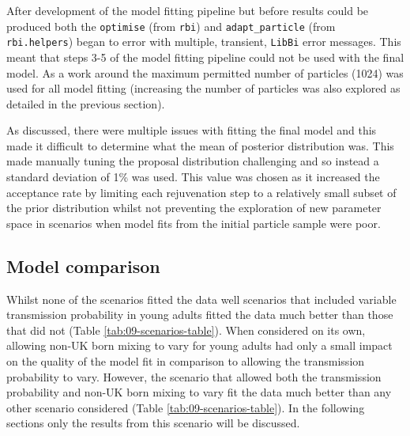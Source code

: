 \documentclass[11pt,twoside]{bristolthesis}
\begin{document}
  After development of the model fitting pipeline but before results could be produced both the \texttt{optimise} (from \texttt{rbi}) and \texttt{adapt\_particle} (from \texttt{rbi.helpers}) began to error with multiple, transient, \texttt{LibBi} error messages. This meant that steps 3-5 of the model fitting pipeline could not be used with the final model. As a work around the maximum permitted number of particles (1024) was used for all model fitting (increasing the number of particles was also explored as detailed in the previous section).
  
  As discussed, there were multiple issues with fitting the final model and this made it difficult to determine what the mean of posterior distribution was. This made manually tuning the proposal distribution challenging and so instead a standard deviation of 1\% was used. This value was chosen as it increased the acceptance rate by limiting each rejuvenation step to a relatively small subset of the prior distribution whilst not preventing the exploration of new parameter space in scenarios when model fits from the initial particle sample were poor.
  
  \hypertarget{model-comparison-1}{%
  \subsection{Model comparison}\label{model-comparison-1}}
  
  Whilst none of the scenarios fitted the data well scenarios that included variable transmission probability in young adults fitted the data much better than those that did not (Table \ref{tab:09-scenarios-table}). When considered on its own, allowing non-UK born mixing to vary for young adults had only a small impact on the quality of the model fit in comparison to allowing the transmission probability to vary. However, the scenario that allowed both the transmission probability and non-UK born mixing to vary fit the data much better than any other scenario considered (Table \ref{tab:09-scenarios-table}). In the following sections only the results from this scenario will be discussed.
  
\end{document}
